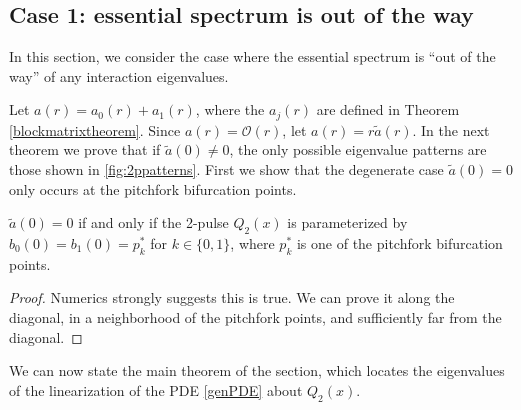 \documentclass[thesis.tex]{subfiles}
\begin{document}
\subsection{Case 1: essential spectrum is out of the way}\label{section:2pernobubble}

In this section, we consider the case where the essential spectrum is ``out of the way'' of any interaction eigenvalues. 

Let $a(r) = a_0(r) + a_1(r)$, where the $a_j(r)$ are defined in Theorem \ref{blockmatrixtheorem}. Since $a(r) = \mathcal{O}(r)$, let $a(r) = r \tilde{a}(r)$. In the next theorem we prove that if $\tilde{a}(0) \neq 0$, the only possible eigenvalue patterns are those shown in \cref{fig:2ppatterns}. First we show that the degenerate case $\tilde{a}(0) = 0$ only occurs at the pitchfork bifurcation points.

\begin{lemma}
$\tilde{a}(0) = 0$ if and only if the 2-pulse $Q_2(x)$ is parameterized by $b_0(0) = b_1(0) = p_k^*$ for $k \in \{0, 1\}$, where $p_k^*$ is one of the pitchfork bifurcation points.
\begin{proof}
Numerics strongly suggests this is true. We can prove it along the diagonal, in a neighborhood of the pitchfork points, and sufficiently far from the diagonal.
\end{proof}
\end{lemma}

We can now state the main theorem of the section, which locates the eigenvalues of the linearization of the PDE \cref{genPDE} about $Q_2(x)$.
\end{document}

